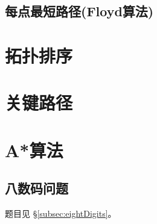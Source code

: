 \subsection{每点最短路径(Floyd算法)}

\section{拓扑排序} %

\section{关键路径} %

\section{A*算法} %
\label{sec:astar}

\subsection{八数码问题}
题目见 \S \ref{subsec:eightDigits}。

